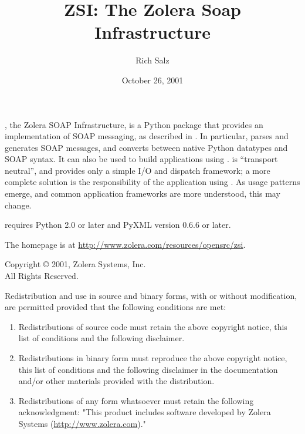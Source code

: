 \documentclass{manual}
\title{ZSI: The Zolera Soap Infrastructure}
\author{Rich Salz}
\date{October 26, 2001}
\begin{document}
\maketitle

\centerline{}

, the Zolera SOAP Infrastructure, is a Python package that
provides an implementation of SOAP messaging, as described in
.
In particular,  parses and generates SOAP messages, and
converts between native Python datatypes and SOAP syntax.
It can also be used to build applications using
.
 is ``transport neutral'', and provides only a simple
I/O and dispatch framework; a more complete solution is the
responsibility of the application using .
As usage patterns emerge, and common application frameworks are
more understood, this may change.

 requires Python 2.0 or later and PyXML version 0.6.6 or later.

The  homepage is at
\url{http://www.zolera.com/resources/opensrc/zsi}.

\vfill

\centerline{}

Copyright \copyright{} 2001, Zolera Systems, Inc.\\
All Rights Reserved.

Redistribution and use in source and binary forms, with or without
modification, are permitted provided that the following conditions
are met:

\begin{enumerate}

\item
Redistributions of source code must retain the above copyright
notice, this list of conditions and the following disclaimer. 

\item
Redistributions in binary form must reproduce the above copyright
notice, this list of conditions and the following disclaimer in
the documentation and/or other materials provided with the
distribution.

\item
Redistributions of any form whatsoever must retain the following
acknowledgment:
"This product includes software developed by Zolera Systems
(\url{http://www.zolera.com})."

\end{enumerate}
\end{document}

